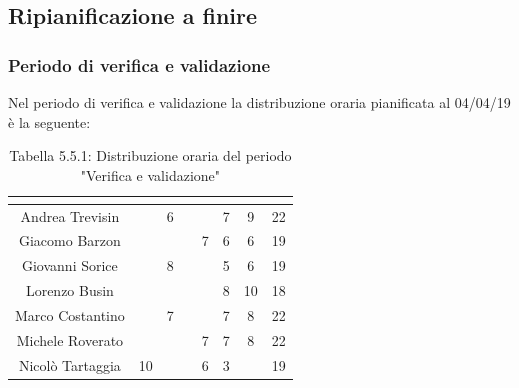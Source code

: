 \subsection{Ripianificazione a finire}

\subsubsection{Periodo di verifica e validazione}
Nel periodo di verifica e validazione la distribuzione oraria pianificata al 04/04/19 è la seguente:

\renewcommand{\arraystretch}{1.5}
\begin{table}[H]
\begin{center}
\begin{tabular}{|c|c|c|c|c|c|c|c|}
\hline
\rowcolor{title_row}
\textbf{\color{title_text}{Nome}} & \textbf{\color{title_text}{Resp.}} & \textbf{\color{title_text}{Ammi.}} & \textbf{\color{title_text}{Analist.}} & \textbf{\color{title_text}{Progett.}} & \textbf{\color{title_text}{Program.}} & \textbf{\color{title_text}{Verific.}} & \textbf{\color{title_text}{Totale}} \\ \hline
Andrea Trevisin  & & 6 & & & 7 & 9 & 22  \\ \hline
Giacomo Barzon   & & & & 7 & 6 & 6 & 19  \\ \hline
Giovanni Sorice  & & 8 & &  & 5 & 6 & 19  \\ \hline
Lorenzo Busin    & & & & & 8 & 10 & 18  \\ \hline
Marco Costantino & & 7 & & & 7 & 8 & 22  \\ \hline
Michele Roverato & & & & 7 & 7 & 8 & 22  \\ \hline
Nicolò Tartaggia & 10 & & & 6 & 3 & & 19  \\ \hline
\end{tabular}
\caption{Tabella 5.5.1: Distribuzione oraria del periodo "Verifica e validazione"\label{}}
\end{center}
\end{table}
\renewcommand{\arraystretch}{1}

